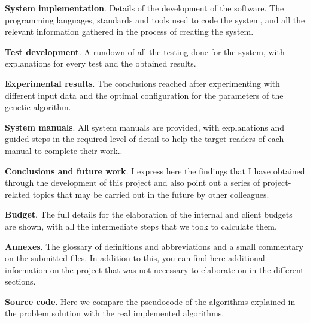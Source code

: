 \begin{description}
    \item \textbf{System implementation}. Details of the development of the software. The programming languages, standards and tools used to code the system, and all the relevant information gathered in the process of creating the system.

    \item \textbf{Test development}. A rundown of all the testing done for the system, with explanations for every test and the obtained results. 

    \item \textbf{Experimental results}. The conclusions reached after experimenting with different input data and the optimal configuration for the parameters of the genetic algorithm. 

    \item \textbf{System manuals}. All system manuals are provided, with explanations and guided steps in the required level of detail to help the target readers of each manual to complete their work..

    \item \textbf{Conclusions and future work}. I express here the findings that I have obtained through the development of this project and also point out a series of project-related topics that may be carried out in the future by other colleagues. 

    \item \textbf{Budget}. The full details for the elaboration of the internal and client budgets are shown, with all the intermediate steps that we took to calculate them. 

    \item \textbf{Annexes}. The glossary of definitions and abbreviations and a small commentary on the submitted files. In addition to this, you can find here additional information on the project that was not necessary to elaborate on in the different sections. 

    \item \textbf{Source code}. Here we compare the pseudocode of the algorithms explained in the problem solution with the real implemented algorithms. 

\end{description}

